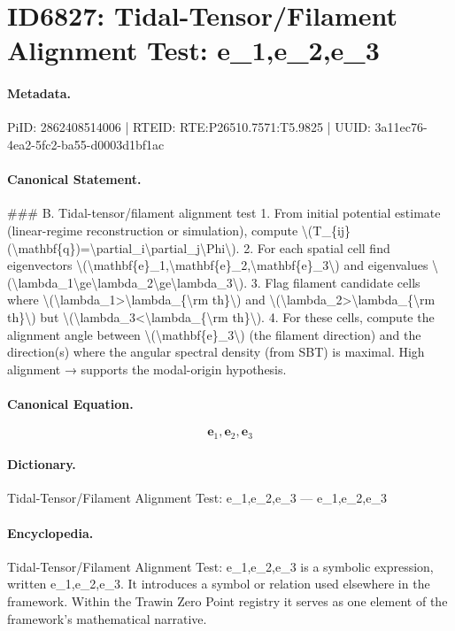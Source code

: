 \section*{ID6827: Tidal-Tensor/Filament Alignment Test: e\_1,e\_2,e\_3}
\paragraph{Metadata.}
PiID: 2862408514006 | RTEID: RTE:P26510.7571:T5.9825 | UUID: 3a11ec76-4ea2-5fc2-ba55-d0003d1bf1ac

\paragraph{Canonical Statement.}
\#\#\# B. Tidal-tensor/filament alignment test 1. From initial potential estimate (linear-regime reconstruction or simulation), compute \textbackslash{}(T\_\{ij\}(\textbackslash{}mathbf\{q\})=\textbackslash{}partial\_i\textbackslash{}partial\_j\textbackslash{}Phi\textbackslash{}). 2. For each spatial cell find eigenvectors \textbackslash{}(\textbackslash{}mathbf\{e\}\_1,\textbackslash{}mathbf\{e\}\_2,\textbackslash{}mathbf\{e\}\_3\textbackslash{}) and eigenvalues \textbackslash{}(\textbackslash{}lambda\_1\textbackslash{}ge\textbackslash{}lambda\_2\textbackslash{}ge\textbackslash{}lambda\_3\textbackslash{}). 3. Flag filament candidate cells where \textbackslash{}(\textbackslash{}lambda\_1>\textbackslash{}lambda\_\{\textbackslash{}rm th\}\textbackslash{}) and \textbackslash{}(\textbackslash{}lambda\_2>\textbackslash{}lambda\_\{\textbackslash{}rm th\}\textbackslash{}) but \textbackslash{}(\textbackslash{}lambda\_3<\textbackslash{}lambda\_\{\textbackslash{}rm th\}\textbackslash{}). 4. For these cells, compute the alignment angle between \textbackslash{}(\textbackslash{}mathbf\{e\}\_3\textbackslash{}) (the filament direction) and the direction(s) where the angular spectral density (from SBT) is maximal. High alignment → supports the modal-origin hypothesis.

\paragraph{Canonical Equation.}
\[
\mathbf{e}_1,\mathbf{e}_2,\mathbf{e}_3
\]

\paragraph{Dictionary.}
Tidal-Tensor/Filament Alignment Test: e\_1,e\_2,e\_3 — e\_1,e\_2,e\_3

\paragraph{Encyclopedia.}
Tidal-Tensor/Filament Alignment Test: e\_1,e\_2,e\_3 is a symbolic expression, written e\_1,e\_2,e\_3. It introduces a symbol or relation used elsewhere in the framework. Within the Trawin Zero Point registry it serves as one element of the framework's mathematical narrative.
